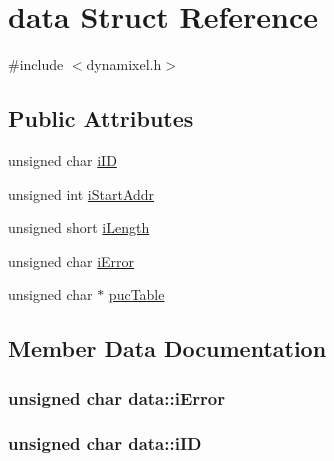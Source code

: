 \hypertarget{structdata}{}\section{data Struct Reference}
\label{structdata}


{\ttfamily \#include $<$dynamixel.\+h$>$}

\subsection*{Public Attributes}
\begin{DoxyCompactItemize}
\item 
unsigned char \hyperlink{structdata_a5a553f5c59b2c973d161ea3352c32d07}{i\+I\+D}
\item 
unsigned int \hyperlink{structdata_a849125c9807b08e525118cdca5a255fe}{i\+Start\+Addr}
\item 
unsigned short \hyperlink{structdata_a836daaa4328239851986211241acbcca}{i\+Length}
\item 
unsigned char \hyperlink{structdata_a907d6311fb7b92b5960df0bef3b32c43}{i\+Error}
\item 
unsigned char $\ast$ \hyperlink{structdata_a03c940df871cecb40e4f5ca39f14cc49}{puc\+Table}
\end{DoxyCompactItemize}


\subsection{Member Data Documentation}
\hypertarget{structdata_a907d6311fb7b92b5960df0bef3b32c43}{}
\subsubsection[{i\+Error}]{\setlength{\rightskip}{0pt plus 5cm}unsigned char data\+::i\+Error}\label{structdata_a907d6311fb7b92b5960df0bef3b32c43}
\hypertarget{structdata_a5a553f5c59b2c973d161ea3352c32d07}{}
\subsubsection[{i\+I\+D}]{\setlength{\rightskip}{0pt plus 5cm}unsigned char data\+::i\+I\+D}\label{structdata_a5a553f5c59b2c973d161ea3352c32d07}
\hypertarget{structdata_a836daaa4328239851986211241acbcca}{}
